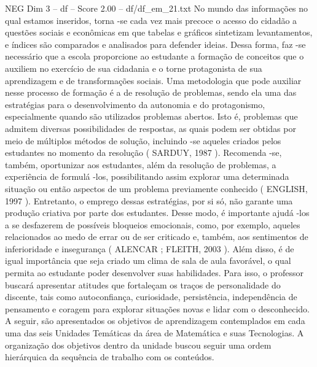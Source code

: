 \begin{textsample}{NEG Dim 3 – df – Score 2.00 – df/df\_em\_21.txt}
No mundo das informações no qual estamos inseridos, torna -se cada vez mais precoce o acesso do cidadão a questões sociais e econômicas em que tabelas e gráficos sintetizam levantamentos, e índices são comparados e analisados para defender ideias.
Dessa forma, faz -se necessário que a escola proporcione ao estudante a formação de conceitos que o auxiliem no exercício de sua cidadania e o torne protagonista de sua aprendizagem e de transformações sociais.
Uma metodologia que pode auxiliar nesse processo de formação é a de resolução de problemas, sendo ela uma das estratégias para o desenvolvimento da autonomia e do protagonismo, especialmente quando são utilizados problemas abertos.
Isto é, problemas que admitem diversas possibilidades de respostas, as quais podem ser obtidas por meio de múltiplos métodos de solução, incluindo -se aqueles criados pelos estudantes no momento da resolução ( SARDUY, 1987 ).
Recomenda -se, também, oportunizar aos estudantes, além da resolução de problemas, a experiência de formulá -los, possibilitando assim explorar uma determinada situação ou então aspectos de um problema previamente conhecido ( ENGLISH, 1997 ).
Entretanto, o emprego dessas estratégias, por si só, não garante uma produção criativa por parte dos estudantes.
Desse modo, é importante ajudá -los a se desfazerem de possíveis bloqueios emocionais, como, por exemplo, aqueles relacionados ao medo de errar ou de ser criticado e, também, aos sentimentos de inferioridade e insegurança ( ALENCAR ; FLEITH, 2003 ).
Além disso, é de igual importância que seja criado um clima de sala de aula favorável, o qual permita ao estudante poder desenvolver suas habilidades.
Para isso, o professor buscará apresentar atitudes que fortaleçam os traços de personalidade do discente, tais como autoconfiança, curiosidade, persistência, independência de pensamento e coragem para explorar situações novas e lidar com o desconhecido.
A seguir, são apresentados os objetivos de aprendizagem contemplados em cada uma das seis Unidades Temáticas da área de Matemática e suas Tecnologias.
A organização dos objetivos dentro da unidade buscou seguir uma ordem hierárquica da sequência de trabalho com os conteúdos.

\end{textsample}
